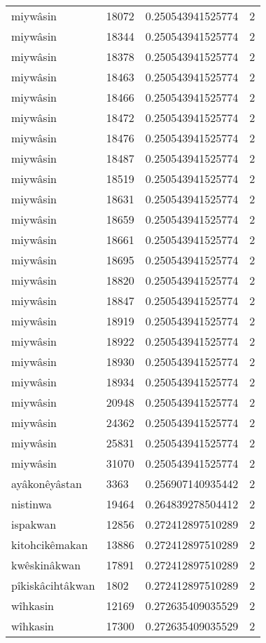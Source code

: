 \begin{longtable}{llll}
miywâsin & 18072 & 0.250543941525774 & 2 \\
miywâsin & 18344 & 0.250543941525774 & 2 \\
miywâsin & 18378 & 0.250543941525774 & 2 \\
miywâsin & 18463 & 0.250543941525774 & 2 \\
miywâsin & 18466 & 0.250543941525774 & 2 \\
miywâsin & 18472 & 0.250543941525774 & 2 \\
miywâsin & 18476 & 0.250543941525774 & 2 \\
miywâsin & 18487 & 0.250543941525774 & 2 \\
miywâsin & 18519 & 0.250543941525774 & 2 \\
miywâsin & 18631 & 0.250543941525774 & 2 \\
miywâsin & 18659 & 0.250543941525774 & 2 \\
miywâsin & 18661 & 0.250543941525774 & 2 \\
miywâsin & 18695 & 0.250543941525774 & 2 \\
miywâsin & 18820 & 0.250543941525774 & 2 \\
miywâsin & 18847 & 0.250543941525774 & 2 \\
miywâsin & 18919 & 0.250543941525774 & 2 \\
miywâsin & 18922 & 0.250543941525774 & 2 \\
miywâsin & 18930 & 0.250543941525774 & 2 \\
miywâsin & 18934 & 0.250543941525774 & 2 \\
miywâsin & 20948 & 0.250543941525774 & 2 \\
miywâsin & 24362 & 0.250543941525774 & 2 \\
miywâsin & 25831 & 0.250543941525774 & 2 \\
miywâsin & 31070 & 0.250543941525774 & 2 \\
ayâkonêyâstan & 3363 & 0.256907140935442 & 2 \\
nistinwa & 19464 & 0.264839278504412 & 2 \\
ispakwan & 12856 & 0.272412897510289 & 2 \\
kitohcikêmakan & 13886 & 0.272412897510289 & 2 \\
kwêskinâkwan & 17891 & 0.272412897510289 & 2 \\
pîkiskâcihtâkwan & 1802 & 0.272412897510289 & 2 \\
wîhkasin & 12169 & 0.272635409035529 & 2 \\
wîhkasin & 17300 & 0.272635409035529 & 2 \\

\end{longtable}
